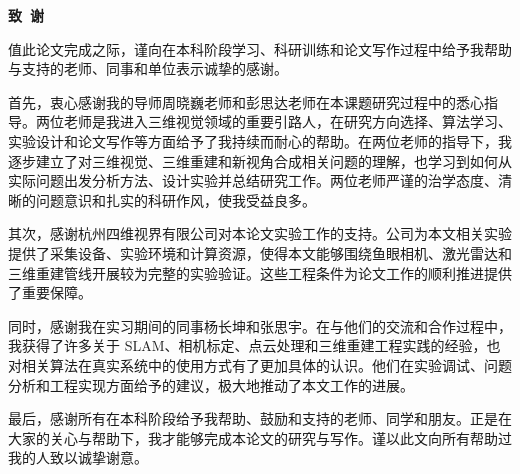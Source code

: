 \cleardoublepage{}
\begin{center}
    \bfseries {} 致~谢
    
\end{center}

值此论文完成之际，谨向在本科阶段学习、科研训练和论文写作过程中给予我帮助与支持的老师、同事和单位表示诚挚的感谢。

首先，衷心感谢我的导师周晓巍老师和彭思达老师在本课题研究过程中的悉心指导。两位老师是我进入三维视觉领域的重要引路人，在研究方向选择、算法学习、实验设计和论文写作等方面给予了我持续而耐心的帮助。在两位老师的指导下，我逐步建立了对三维视觉、三维重建和新视角合成相关问题的理解，也学习到如何从实际问题出发分析方法、设计实验并总结研究工作。两位老师严谨的治学态度、清晰的问题意识和扎实的科研作风，使我受益良多。

其次，感谢杭州四维视界有限公司对本论文实验工作的支持。公司为本文相关实验提供了采集设备、实验环境和计算资源，使得本文能够围绕鱼眼相机、激光雷达和三维重建管线开展较为完整的实验验证。这些工程条件为论文工作的顺利推进提供了重要保障。

同时，感谢我在实习期间的同事杨长坤和张思宇。在与他们的交流和合作过程中，我获得了许多关于 SLAM、相机标定、点云处理和三维重建工程实践的经验，也对相关算法在真实系统中的使用方式有了更加具体的认识。他们在实验调试、问题分析和工程实现方面给予的建议，极大地推动了本文工作的进展。

最后，感谢所有在本科阶段给予我帮助、鼓励和支持的老师、同学和朋友。正是在大家的关心与帮助下，我才能够完成本论文的研究与写作。谨以此文向所有帮助过我的人致以诚挚谢意。
